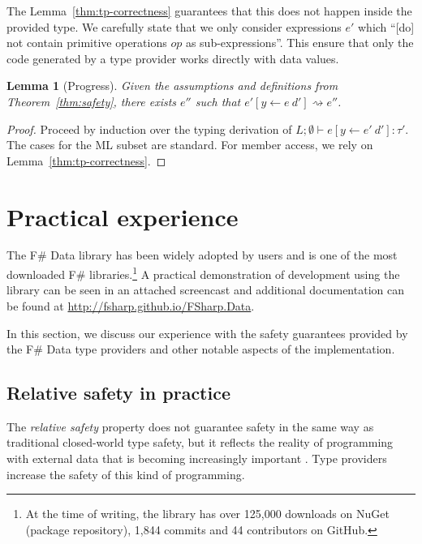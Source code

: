 \documentclass[10pt,nocopyrightspace]{sigplanconf}
\newcommand{\reduce}{\rightsquigarrow}
\newtheorem{lemma}[theorem]{Lemma}
\begin{document}
The Lemma~\ref{thm:tp-correctness} guarantees that this does not happen inside the provided type.
We carefully state that we only consider expressions $e'$ which
``[do] not contain primitive operations $op$ as sub-expressions''. This ensure that only
the code generated by a type provider works directly with data values.

\begin{lemma}[Progress]
\label{thm:rs-progress}
Given the assumptions and definitions from Theorem~\ref{thm:safety}, there exists $e''$ such that
$e'[y\leftarrow e~d'] \reduce e''$.
\end{lemma}
\begin{proof}
Proceed by induction over the typing derivation of $L; \emptyset \vdash e[y\leftarrow e'~d'] : \tau'$.
The cases for the ML subset are standard. For member access, we rely on Lemma~\ref{thm:tp-correctness}.
\end{proof}





\section{Practical experience}
\label{sec:impl}

The F\# Data library has been widely adopted by users and is one of the most downloaded
F\# libraries.\footnote{At the time of writing, the library has over 125,000 downloads on NuGet
(package repository), 1,844 commits and 44 contributors on GitHub.} A practical demonstration of
development using the library can be seen in an attached screencast and additional documentation can be
found at \url{http://fsharp.github.io/FSharp.Data}.

In this section, we discuss our experience with the safety guarantees provided by the
F\# Data type providers and other notable aspects of the implementation.

\subsection{Relative safety in practice}
\label{sec:safety-discuss}

The \emph{relative safety} property does not guarantee safety in the same way as traditional
closed-world type safety, but it reflects the reality of programming with external data that is
becoming increasingly important \cite{age-of-web}. Type providers increase the safety of this kind of
programming.
\end{document}
